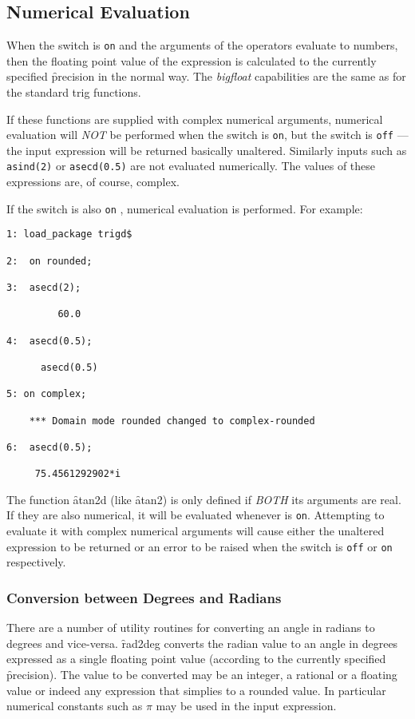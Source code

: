 \subsection{Numerical Evaluation}
When the switch  is \texttt{on} and the arguments of the operators evaluate to numbers, then the floating point value of the expression is calculated to the currently specified \f{precision} in the normal way.  The \textit{bigfloat} capabilities are  the same as for the standard trig functions.   

If these functions are supplied with complex  numerical arguments, numerical evaluation will \emph{NOT} be performed when the switch  is \texttt{on}, but the switch  is  \texttt{off} --- the input expression will be returned basically unaltered. Similarly inputs such as 
\texttt{asind(2)} or \texttt{asecd(0.5)} are not evaluated numerically.  The values of these expressions are, of course, complex.

If the switch  is also \texttt{on} , numerical evaluation is performed.  For example:
\begin{verbatim}
1: load_package trigd$

2:  on rounded;

3:  asecd(2);

         60.0

4:  asecd(0.5);

      asecd(0.5)

5: on complex;

    *** Domain mode rounded changed to complex-rounded

6:  asecd(0.5);

     75.4561292902*i

\end{verbatim}

The function \f{atan2d} (like \f{atan2}) is only defined if \emph{BOTH} its arguments are real. If they are also numerical, it will be evaluated whenever   is \texttt{on}. Attempting to evaluate it with complex numerical arguments will cause either the unaltered expression to be returned or an error to be 
raised when the switch  is \texttt{off} or \texttt{on} respectively.

\iffalse
\subsubsection{Conversion between Degrees and Radians}
There are a number of utility routines for converting an angle in radians to degrees and vice-versa.  \f{rad2deg} converts the radian value to  an angle in degrees expressed as a single floating point value (according to the currently specified \f{precision}).  
The value to be converted may be an integer, a rational or a floating value or indeed any expression that simplies to a rounded value. In particular  numerical constants such as $\pi$ may be used in the input expression.

